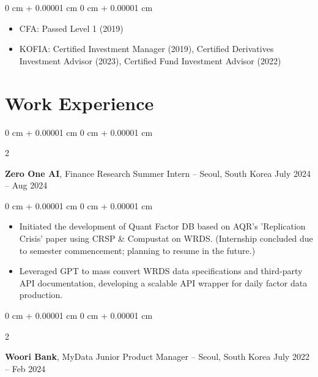 \documentclass[10pt, letterpaper]{article}
\newenvironment{highlights}{
    \begin{itemize}[
        topsep=0.10 cm,
        parsep=0.10 cm,
        partopsep=0pt,
        itemsep=0pt,
        leftmargin=0 cm + 10pt
    ]
}{
    \end{itemize}
} %
\newenvironment{onecolentry}{
    \begin{adjustwidth}{
        0 cm + 0.00001 cm
    }{
        0 cm + 0.00001 cm
    }
}{
    \end{adjustwidth}
} %
\newenvironment{twocolentry}[2][]{
    \onecolentry
    \def\secondColumn{#2}
    \setcolumnwidth{\fill, 4.5 cm}
    \begin{paracol}{2}
}{
    \switchcolumn \raggedleft \secondColumn
    \end{paracol}
    \endonecolentry
} %
\begin{document}
        \vspace{0.10 cm}
        \begin{onecolentry}
            \begin{highlights}
                \item CFA: Passed Level 1 (2019)
                \item KOFIA: Certified Investment Manager (2019), Certified Derivatives Investment Advisor (2023), Certified Fund Investment Advisor (2022)
            \end{highlights}
        \end{onecolentry}



    
    \section{Work Experience}



        
        \begin{twocolentry}{
            July 2024 – Aug 2024
        }
            \textbf{Zero One AI}, Finance Research Summer Intern -- Seoul, South Korea\end{twocolentry}

        \vspace{0.10 cm}
        \begin{onecolentry}
            \begin{highlights}
                \item Initiated the development of Quant Factor DB based on AQR's 'Replication Crisis' paper using CRSP \& Compustat on WRDS. (Internship concluded due to semester commencement; planning to resume in the future.)
                \item Leveraged GPT to mass convert WRDS data specifications and third-party API documentation, developing a scalable API wrapper for daily factor data production.
            \end{highlights}
        \end{onecolentry}


        \vspace{0.2 cm}

        \begin{twocolentry}{
            July 2022 – Feb 2024
        }
            \textbf{Woori Bank}, MyData Junior Product Manager -- Seoul, South Korea\end{twocolentry}
\end{document}
